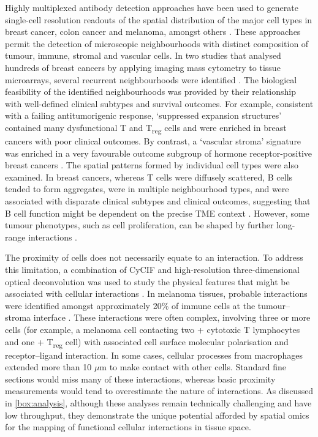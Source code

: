 Highly multiplexed antibody detection approaches have been used to generate single-cell resolution readouts of the spatial distribution of the major cell types in breast cancer, colon cancer and melanoma, amongst others \parencite{Danenberg2022-zb,Jackson2020-em,Nirmal2022-sq,Schurch2020-lp}. These approaches permit the detection of microscopic neighbourhoods with distinct composition of tumour, immune, stromal and vascular cells. In two studies that analysed hundreds of breast cancers by applying imaging mass cytometry  to tissue microarrays, several recurrent neighbourhoods were identified \parencite{Danenberg2022-zb,Jackson2020-em} . The biological feasibility of the identified neighbourhoods was provided by their relationship with well-defined clinical subtypes and survival outcomes. For example, consistent with a failing antitumorigenic response, ‘suppressed expansion structures’ contained many dysfunctional T and T\textsubscript{reg} cells and were enriched in breast cancers with poor clinical outcomes. By contrast, a ‘vascular stroma’ signature was enriched in a very favourable outcome subgroup of hormone receptor-positive breast cancers  . The spatial patterns formed by individual cell types were also examined. In breast cancers, whereas T cells were diffusely scattered, B cells tended to form aggregates, were in multiple neighbourhood types, and were associated with disparate clinical subtypes and clinical outcomes, suggesting that B cell function might be dependent on the precise TME context \parencite{Wieland2021-ep} . However, some tumour phenotypes, such as cell proliferation, can be shaped by further long-range interactions \parencite{Gaglia2022-zn}.

The proximity of cells does not necessarily equate to an interaction. To address this limitation, a combination of \ac{CyCIF}  and high-resolution three-dimensional optical deconvolution was used to study the physical features that might be associated with cellular interactions \parencite{Nirmal2022-sq}. In melanoma tissues, probable interactions were identified amongst approximately 20\% of immune cells at the tumour–stroma interface . These interactions were often complex, involving three or more cells (for example, a melanoma cell contacting two + cytotoxic T lymphocytes and one + T\textsubscript{reg} cell) with associated cell surface molecular polarisation and receptor–ligand interaction. In some cases, cellular processes from macrophages extended more than 10 $\mu$m to make contact with other cells. Standard fine sections would miss many of these interactions, whereas basic proximity measurements would tend to overestimate the nature of interactions. As discussed in \cref{box:analysis}, although these analyses remain technically challenging and have low throughput, they demonstrate the unique potential afforded by spatial omics for the mapping of functional cellular interactions in tissue space.

